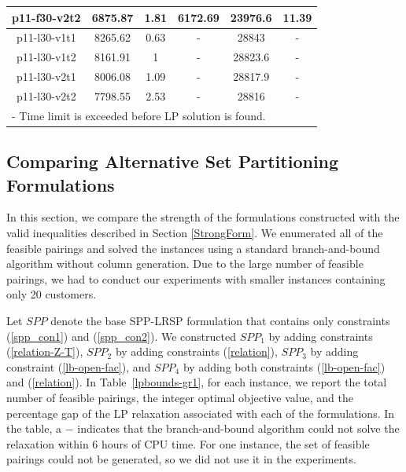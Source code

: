 \begin{table}[h]
\begin {tabular}[h]{|c|c|c|c|c|c|}
p11-f30-v2t2 &  6875.87 & 1.81      &   6172.69 &  23976.6  & 11.39 \\\hline
p11-l30-v1t1 &  8265.62 & 0.63      &   \mbox{-} & 28843    & \mbox{-} \\
p11-l30-v1t2 &  8161.91 & 1     &   \mbox{-} & 28823.6  & \mbox{-} \\
p11-l30-v2t1 &  8006.08 & 1.09      &   \mbox{-} & 28817.9  & \mbox{-} \\
p11-l30-v2t2 &  7798.55 & 2.53      &   \mbox{-} & 28816    & \mbox{-} \\\hline
\multicolumn{6}{l}{- Time limit is exceeded before LP solution is found.}
\end{tabular}
\end{table}

\subsection{Comparing  Alternative Set Partitioning Formulations}
\label{alternativeForm}
In this section, we compare the strength of the formulations constructed with
the valid inequalities described in Section \ref{StrongForm}.
We enumerated all of the feasible pairings and solved the instances using a
standard branch-and-bound algorithm without column generation.
Due to the large number of feasible pairings,
we had to conduct our experiments with smaller instances containing only 20 customers.

Let $SPP$ denote the base SPP-LRSP formulation that contains only constraints
(\ref{spp_con1}) and (\ref{spp_con2}).  We constructed $SPP_1$ by adding constraints
(\ref{relation-Z-T}), $SPP_2$ by adding constraints (\ref{relation}),
$SPP_3$ by adding constraint (\ref{lb-open-fac}), and $SPP_4$ by adding
both constraints (\ref{lb-open-fac}) and (\ref{relation}).
In Table~\ref{lpbounds-gr1}, for each instance, we report the total number of feasible pairings,
the integer optimal objective value, and the percentage gap of
the LP relaxation associated with each of the formulations.
In the table, a $-$ indicates that the branch-and-bound algorithm could not solve the
relaxation within 6 hours of CPU time.  For one instance, the set of feasible pairings
could not be generated, so we did not use it in the experiments.

